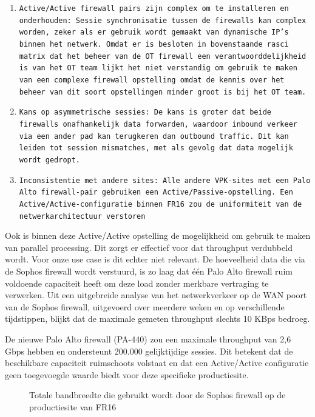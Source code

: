 \begin{enumerate}
    \item \texttt{Active/Active firewall pairs zijn complex om te installeren en onderhouden: Sessie synchronisatie tussen de firewalls kan complex worden, zeker als er gebruik wordt gemaakt van dynamische IP’s binnen het netwerk. Omdat er is besloten in bovenstaande rasci matrix dat het beheer van de OT firewall een verantwoorddelijkheid is van het OT team lijkt het niet verstandig om gebruik te maken van een complexe firewall opstelling omdat de kennis over het beheer van dit soort opstellingen minder groot is bij het OT team.}
    
    \item \texttt{Kans op asymmetrische sessies: De kans is groter dat beide firewalls onafhankelijk data forwarden, waardoor inbound verkeer via een ander pad kan terugkeren dan outbound traffic. Dit kan leiden tot session mismatches, met als gevolg dat data mogelijk wordt gedropt.}  
    
    \item \texttt{Inconsistentie met andere sites: Alle andere VPK-sites met een Palo Alto firewall-pair gebruiken een Active/Passive-opstelling. Een Active/Active-configuratie binnen FR16 zou de uniformiteit van de netwerkarchitectuur verstoren}    
\end{enumerate}


Ook is binnen deze Active/Active opstelling de mogelijkheid om gebruik te maken van parallel processing. Dit zorgt er effectief voor dat throughput verdubbeld wordt. \autocite{Fulp2006} Voor onze use case is dit echter niet relevant. De hoeveelheid data die via de Sophos firewall wordt verstuurd, is zo laag dat één Palo Alto firewall ruim voldoende capaciteit heeft om deze load zonder merkbare vertraging te verwerken. Uit een uitgebreide analyse van het netwerkverkeer op de WAN poort van de Sophos firewall, uitgevoerd over meerdere weken en op verschillende tijdstippen, blijkt dat de maximale gemeten throughput slechts 10 KBps bedroeg.


De nieuwe Palo Alto firewall (PA-440) zou een maximale throughput van 2,6 Gbps hebben en ondersteunt 200.000 gelijktijdige sessies. \autocite{PaloAltoDS2025} Dit betekent dat de beschikbare capaciteit ruimschoots volstaat en dat een Active/Active configuratie geen toegevoegde waarde biedt voor deze specifieke productiesite.

\begin{figure}[H]
    \centering
    \caption[PA High Availability settings]{\label{fig:grail}Totale bandbreedte die gebruikt wordt door de Sophos firewall op de productiesite van FR16}
\end{figure}




